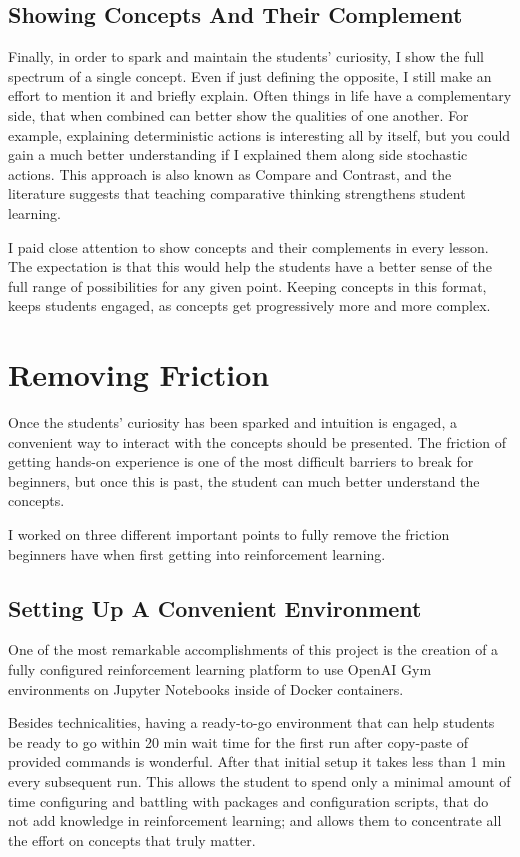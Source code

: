 \documentclass[11pt]{article} %
\begin{document}
\subsection{Showing Concepts And Their Complement}

Finally, in order to spark and maintain the students' curiosity, I show the
full spectrum of a single concept. Even if just defining the opposite, I 
still make an effort to mention it and briefly explain. Often things in
life have a complementary side, that when combined can better show the qualities
of one another. For example, explaining deterministic actions is interesting
all by itself, but you could gain a much better understanding if I explained
them along side stochastic actions. This approach is also known as Compare and
Contrast, and the literature suggests that teaching comparative thinking
strengthens student learning\cite{compare}.

I paid close attention to show concepts and their complements in every
lesson. The expectation is that this would help the students have a better
sense of the full range of possibilities for any given point. Keeping concepts in this format,
keeps students engaged, as concepts get progressively more and more complex.

\section{Removing Friction}

Once the students' curiosity has been sparked and intuition is engaged, a
convenient way to interact with the concepts should be presented. The
friction of getting hands-on experience is one of the most difficult
barriers to break for beginners, but once this is past, the student can
much better understand the concepts.

I worked on three different important points to fully remove the friction
beginners have when first getting into reinforcement learning.

\subsection{Setting Up A Convenient Environment}

One of the most remarkable accomplishments of this project is the creation
of a fully configured reinforcement learning platform to use OpenAI
Gym \cite{openaigym} environments on Jupyter Notebooks inside of Docker
containers.

Besides technicalities, having a ready-to-go environment that can help
students be ready to go within 20 min wait time for the first run after
copy-paste of provided commands is wonderful. After that initial setup
it takes less than 1 min every subsequent run. This allows the student to spend
only a minimal amount of time configuring and battling with packages and configuration
scripts, that do not add knowledge in reinforcement learning; and allows them to concentrate
 all the effort on concepts that truly matter.
\end{document}
